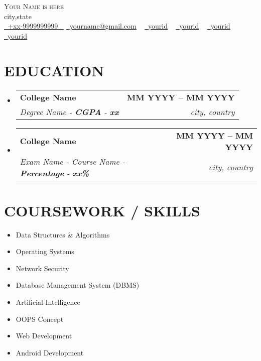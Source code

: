 \documentclass[letterpaper,11pt]{article}
\makeatletter
\newcommand{\resumeSubheading}[4]{
  \vspace{-2pt}\item
    \begin{tabular*}{1.0\textwidth}[t]{l@{\extracolsep{\fill}}r}
      \textbf{\large#1} & \textbf{\small #2} \\
      \textit{\large#3} & \textit{\small #4} \\
     
    \end{tabular*}\vspace{-7pt}
}
\newcommand{\resumeSubHeadingListStart}{\begin{itemize}[leftmargin=0.0in, label={}]}
\newcommand{\resumeSubHeadingListEnd}{\end{itemize}}
\makeatother
\begin{document}




\begin{center}
    {\Huge \scshape Your Name is here} \\ \vspace{1pt}
    city,state \\ \vspace{1pt}
    \small \href{tel:+xxxxxxxxxxxx}{ \raisebox{-0.1\height}\faPhone\ \underline{+xx-9999999999} ~} 
    \href{mailto:yourname@gmail.com}{\raisebox{-0.2\height}\faEnvelope\  \underline{yourname@gmail.com}} ~
    \href{https://linkedin.com/in/yourid}{\raisebox{-0.2\height}\faLinkedinSquare\ \underline{yourid}}  ~
    \href{https://github.com/yourid}{\raisebox{-0.2\height}\faGithub\ \underline{yourid}} ~
    \href{https://www.hackerrank.com/yourid}{\raisebox{-0.2\height}\faHackerrank\ \underline{yourid}} ~
    \href{https://codeforces.com/profile/yourid}{\raisebox{-0.2\height}\faPoll\ \underline{yourid}}
    \vspace{-8pt}
\end{center}




\section{EDUCATION}
  \resumeSubHeadingListStart
    \resumeSubheading
      {College Name}{MM YYYY -- MM YYYY}
      {Degree Name - \textbf{CGPA} - \textbf{xx}}{city, country}
  \resumeSubHeadingListEnd
 
  \resumeSubHeadingListStart
    \resumeSubheading
      {College Name}{MM YYYY -- MM YYYY}
      {Exam Name - Course Name  - \textbf{Percentage} - \textbf{xx\%}}{city, country}
  \resumeSubHeadingListEnd


\section{COURSEWORK / SKILLS}
        \begin{multicols}{4}
            \begin{itemize}[itemsep=-2pt, parsep=5pt]
                \item Data Structures \& Algorithms
                \item Operating Systems
                \item Network Security
                \item Database Management System (DBMS)
               \item Artificial Intelligence
                \item OOPS Concept
                \item Web Development
                \item Android Development
            \end{itemize}
        \end{multicols}
        \vspace*{2.0\multicolsep}
\end{document}
